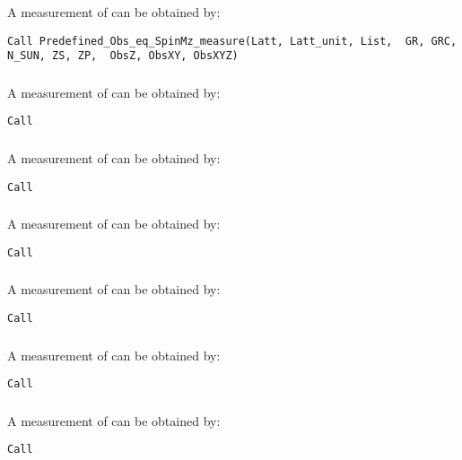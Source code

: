 A measurement of  can be obtained by:

\begin{lstlisting}[style=fortran]
Call Predefined_Obs_eq_SpinMz_measure(Latt, Latt_unit, List,  GR, GRC, N_SUN, ZS, ZP,  ObsZ, ObsXY, ObsXYZ)
\end{lstlisting}

\subsubsection{}

A measurement of  can be obtained by:

\begin{lstlisting}[style=fortran]
Call 
\end{lstlisting}

\subsubsection{}

A measurement of  can be obtained by:

\begin{lstlisting}[style=fortran]
Call 
\end{lstlisting}

\subsubsection{}

A measurement of  can be obtained by:

\begin{lstlisting}[style=fortran]
Call 
\end{lstlisting}

\subsubsection{}

A measurement of  can be obtained by:

\begin{lstlisting}[style=fortran]
Call 
\end{lstlisting}

\subsubsection{}

A measurement of  can be obtained by:

\begin{lstlisting}[style=fortran]
Call 
\end{lstlisting}

\subsubsection{}

A measurement of  can be obtained by:

\begin{lstlisting}[style=fortran]
Call 
\end{lstlisting}
